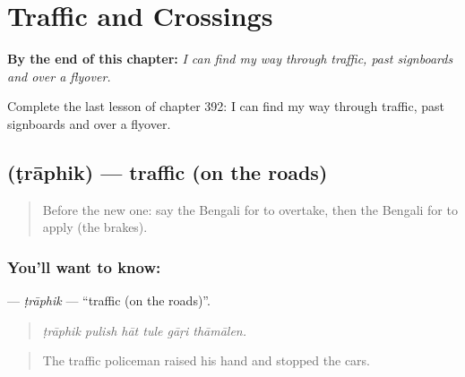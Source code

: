 
\chapter{Traffic and Crossings}
\label{ch:bn-traffic-and-crossings}

\begin{chapteropening}
\textbf{By the end of this chapter:} \emph{I can find my way through traffic, past signboards and over a flyover.}

Complete the last lesson of chapter 392: I can find my way through traffic, past signboards and over a flyover.
\end{chapteropening}

\section[\texorpdfstring{\bn{ট্রাফিক} (ṭrāphik)}{ট্রাফিক (ṭrāphik)}]{ (ṭrāphik) — traffic (on the roads)}

\label{lesson:BN-C392-traphik}



\begin{quote}
Before the new one: say the Bengali for to overtake, then the Bengali for to apply (the brakes).
\end{quote}

\subsection*{You'll want to know: }
\textbf{} — \emph{ṭrāphik} — \textquotedblleft{}traffic (on the roads)\textquotedblright{}.

\begin{quote}
     
\end{quote}

\begin{quote}
\emph{ṭrāphik pulish hāt tule gāṛi thāmālen.}
\end{quote}

\begin{quote}
The traffic policeman raised his hand and stopped the cars.
\end{quote}

